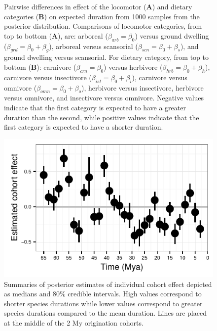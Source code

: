 \begin{figure}[ht]
  \caption[Effect of mammal ecotypes on survival]{Pairwise differences in effect of the locomotor (\textbf{A}) and dietary categories (\textbf{B}) on expected duration from 1000 samples from the posterior distribution. Comparisons of locomotor categories, from top to bottom (\textbf{A}), are: arboreal (\(\beta_{arb} = \beta_{0}\)) versus ground dwelling (\(\beta_{grd} = \beta_{0} + \beta_{g}\)), arboreal versus scansorial (\(\beta_{scn} = \beta_{0} + \beta_{s}\)), and ground dwelling versus scansorial. For dietary category, from top to bottom (\textbf{B}): carnivore (\(\beta_{crn} = \beta_{0}\)) versus herbivore (\(\beta_{hrb} = \beta_{0} + \beta_{h}\)), carnivore versus insectivore (\(\beta_{ist} = \beta_{0} + \beta_{i}\)), carnivore versus omnivore (\(\beta_{omn} = \beta_{0} + \beta_{o}\)), herbivore versus insectivore, herbivore versus omnivore, and insectivore versus omnivore. Negative values indicate that the first category is expected to have a greater duration than the second, while positive values indicate that the first category is expected to have a shorter duration.}
  \label{fig:trait_est}
\end{figure}

\begin{figure}[ht]
  \centering
  \includegraphics{chapter_death_taxa/figure/cohort_est}
  \caption[Effect of cohort on mammal survival]{Summaries of posterior estimates of individual cohort effect depicted as medians and 80\% credible intervals. High values correspond to shorter species durations while lower values correspond to greater species durations compared to the mean duration. Lines are placed at the middle of the 2 My origination cohorts.}
  \label{fig:eff_cohort}
\end{figure}

